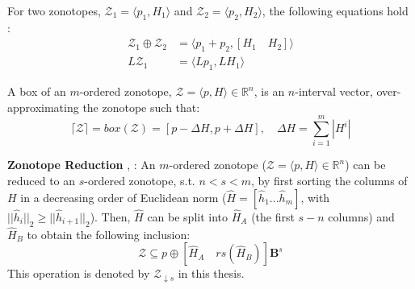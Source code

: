 \begin{lemma} 
For two zonotopes, $\mathcal{Z}_1 = \langle p_1, H_1 \rangle$ and $\mathcal{Z}_2 = \langle p_2, H_2 \rangle$, the following equations hold \cite{Combastel2015}:
\begin{equation}
\begin{split}
\mathcal{Z}_1 \oplus \mathcal{Z}_2 &= \langle p_1+p_2, [H_1 \quad H_2]\rangle \\
L\mathcal{Z}_1 &= \langle Lp_1, LH_1 \rangle 
\end{split}
\end{equation}
\end{lemma}
\begin{lemma} \cite{Tang2019} \label{prop:overapprox}
A box of an $m$-ordered zonotope, $\mathcal{Z} = \langle p, H \rangle \in \mathbb{R}^n$, is an $n$-interval vector, over-approximating the zonotope such that:
\begin{equation}
\lceil \mathcal{Z} \rceil = box(\mathcal{Z}) = [ p - \Delta H , p+ \Delta H], \quad \Delta H = \sum^{m}_{i=1} |H^i| 
\end{equation}
\end{lemma}
\begin{lemma}
\textbf{Zonotope Reduction} \cite{Alamo2005}, \cite{Combastel2003}: An $m$-ordered zonotope ($\mathcal{Z} = \langle p, H \rangle \in \mathbb{R}^n$) can be reduced to an $s$-ordered zonotope, s.t. $n < s < m$, by first sorting the columns of $H$ in a decreasing order of Euclidean norm ($\hat{H}= [\hat{h}_1 ... \hat{h}_m]$, with $||\hat{h}_i||_2 \geq  ||\hat{h}_{i+1}||_2$). Then, $\hat{H}$ can be split into $\hat{H}_A$ (the first $s-n$ columns) and $\hat{H}_B$ to obtain the following inclusion:
\begin{equation}
\mathcal{Z} \subseteq p \oplus [\hat{H}_A \quad rs(\hat{H}_B)]\textbf{B}^s
\end{equation}
This operation is denoted by $\mathcal{Z}_{\downarrow s}$ in this thesis.
\end{lemma}


